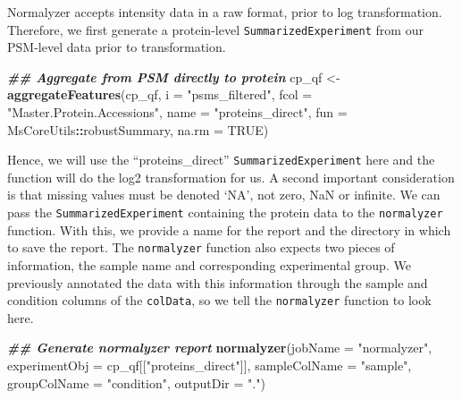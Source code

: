 \documentclass[9pt,a4paper,]{extarticle}
\newenvironment{Shaded}{\begin{snugshade}}{\end{snugshade}}
\newcommand{\AttributeTok}[1]{\textcolor[rgb]{0.13,0.29,0.53}{#1}}
\newcommand{\ConstantTok}[1]{\textcolor[rgb]{0.56,0.35,0.01}{#1}}
\newcommand{\DocumentationTok}[1]{\textcolor[rgb]{0.56,0.35,0.01}{\textbf{\textit{#1}}}}
\newcommand{\FunctionTok}[1]{\textcolor[rgb]{0.13,0.29,0.53}{\textbf{#1}}}
\newcommand{\NormalTok}[1]{#1}
\newcommand{\OtherTok}[1]{\textcolor[rgb]{0.56,0.35,0.01}{#1}}
\newcommand{\SpecialCharTok}[1]{\textcolor[rgb]{0.81,0.36,0.00}{\textbf{#1}}}
\newcommand{\StringTok}[1]{\textcolor[rgb]{0.31,0.60,0.02}{#1}}
\begin{document}
Normalyzer accepts intensity data in a raw format, prior to log transformation.
Therefore, we first generate a protein-level \texttt{SummarizedExperiment} from our
PSM-level data prior to transformation.

\begin{Shaded}
\begin{Highlighting}[]
\DocumentationTok{\#\# Aggregate from PSM directly to protein}
\NormalTok{cp\_qf }\OtherTok{\textless{}{-}} \FunctionTok{aggregateFeatures}\NormalTok{(cp\_qf,}
                           \AttributeTok{i =} \StringTok{"psms\_filtered"}\NormalTok{,}
                           \AttributeTok{fcol =} \StringTok{"Master.Protein.Accessions"}\NormalTok{,}
                           \AttributeTok{name =} \StringTok{"proteins\_direct"}\NormalTok{,}
                           \AttributeTok{fun =}\NormalTok{ MsCoreUtils}\SpecialCharTok{::}\NormalTok{robustSummary,}
                           \AttributeTok{na.rm =} \ConstantTok{TRUE}\NormalTok{)}
\end{Highlighting}
\end{Shaded}

Hence, we will use the ``proteins\_direct'' \texttt{SummarizedExperiment} here and the
function will do the log2 transformation for us. A second important consideration
is that missing values must be denoted `NA', not zero, NaN or infinite. We can
pass the \texttt{SummarizedExperiment} containing the protein data to the \texttt{normalyzer}
function. With this, we provide a name for the report and the directory in which
to save the report. The \texttt{normalyzer} function also expects two pieces of
information, the sample name and corresponding experimental group. We previously
annotated the data with this information through the sample and condition
columns of the \texttt{colData}, so we tell the \texttt{normalyzer} function to look here.

\begin{Shaded}
\begin{Highlighting}[]
\DocumentationTok{\#\# Generate normalyzer report}
\FunctionTok{normalyzer}\NormalTok{(}\AttributeTok{jobName =} \StringTok{"normalyzer"}\NormalTok{,}
           \AttributeTok{experimentObj =}\NormalTok{ cp\_qf[[}\StringTok{"proteins\_direct"}\NormalTok{]],}
           \AttributeTok{sampleColName =} \StringTok{"sample"}\NormalTok{,}
           \AttributeTok{groupColName =} \StringTok{"condition"}\NormalTok{,}
           \AttributeTok{outputDir =} \StringTok{"."}\NormalTok{)}
\end{Highlighting}
\end{Shaded}
\end{document}
